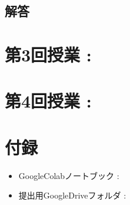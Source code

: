 \documentclass{article}[jsarticle]
\begin{document}
    \subsection{解答}

\section{第3回授業 : }
\section{第4回授業 : }

\section{付録}
\begin{itemize}
    \item GoogleColabノートブック : 
    \item 提出用GoogleDriveフォルダ : 
\end{itemize}
\end{document}
